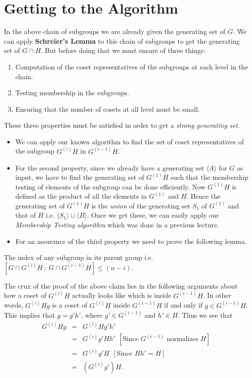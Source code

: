 \section{Getting to the Algorithm }
In the above chain of subgroups we are already given the generating set of $G$. We can apply {\bf Schreier's Lemma} to this chain of subgroups to get the generating set of $G\cap H$. But before doing that we must ensure of three things:
\begin{enumerate}
	\item Computation of the coset representatives of the subgroups at each level in the chain.
	\item Testing membership in the subgroups.
	\item Ensuring that the number of cosets at all level must be small.
\end{enumerate}
These three properties must be satisfied in order to get a \emph{strong generating set}. 
\begin{itemize}
	\item We can apply our known algorithm to find the set of coset representatives of the subgroup $G^{(i)}H$ in $G^{(i-1)}H$.
	\item For the second property, since we already have a generating set $\langle A\rangle$ for $G$ as input, we have to find the generating set of $G^{(1)}H$ such that the membership testing of elements of the subgroup can be done efficiently. Now $G^{(1)}H$ is defined as the product of all the elements in $G^{(1)}$ and $H$. Hence the generating set of $G^{(1)}H$ is the \emph{union} of the generating set $S_1$ of $G^{(1)}$ and that of $H$ i.e. $\langle S_1 \rangle\cup \langle B \rangle$. Once we get these, we can easily apply our \emph{Membership Testing algorithm} which was done in a previous lecture.
	\item For an assurance of the third property we need to prove the following lemma.
\end{itemize}
\begin{claim}\label{coset}
	The index of any subgroup in its parent group i.e. $[G\cap G^{(i)}H~:~G\cap G^{(i-1)}H]\leq (n-i)$.
\end{claim}
The crux of the proof of the above claim lies in the following arguments about how a coset of $G^{(i)}H$ actually looks like which is inside $G^{(i-1)}H$. In other words, $G^{(i)}Hg$ is a coset of $G^{(i)}H$ inside $G^{(i-1)}H$ if and only if $g\in G^{(i-1)}H$. This implies that $g = g'h'$, where $g'\in G^{(i-1)}$ and $h'\in H$. Thus we see that 
\begin{eqnarray*}
	G^{(i)}Hg &=& G^{(i)}Hg'h'\\
			  &=& G^{(i)}g'Hh'~~[\text{Since }G^{(i-1)}\text{ normalizes }H]\\
			  &=& G^{(i)}g'H~~[\text{Since }Hh' = H]\\
			  &=& (G^{(i)}g')H.
\end{eqnarray*}
